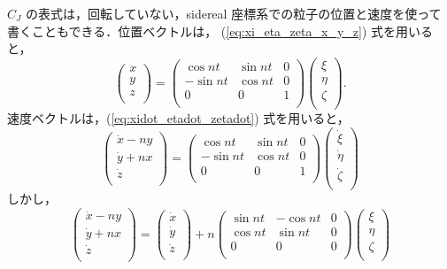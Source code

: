 \documentclass[11pt,a4paper,oneside,onecolumn]{jreport}
\begin{document}
$C_J$ の表式は，回転していない，sidereal 座標系での粒子の位置と速度を使って書くこともできる．位置ベクトルは， (\ref{eq:xi_eta_zeta_x_y_z}) 式を用いると，
\begin{equation}
\begin{pmatrix}
x\\
y\\
z\\
\end{pmatrix}
= 
\begin{pmatrix}
\cos nt & \sin nt & 0\\
- \sin nt & \cos nt & 0\\
0 & 0 & 1\\
\end{pmatrix}
\begin{pmatrix}
\xi\\
\eta\\
\zeta\\
\end{pmatrix}. \label{eq:x_y_z_xi_eta_zeta}
\end{equation}
速度ベクトルは，(\ref{eq:xidot_etadot_zetadot}) 式を用いると，
\begin{equation}
\begin{pmatrix}
\dot{x} - ny\\
\dot{y} + nx\\
\dot{z}\\
\end{pmatrix}
= 
\begin{pmatrix}
\cos nt & \sin nt & 0\\
- \sin nt & \cos nt & 0\\
0 & 0 & 1\\
\end{pmatrix}
\begin{pmatrix}
\dot{\xi}\\
\dot{\eta}\\
\dot{\zeta}\\
\end{pmatrix} \label{eq:xdot_ydot_zdot_1}
\end{equation}
しかし，
\begin{equation}
\begin{pmatrix}
\dot{x} - ny\\
\dot{y} + nx\\
\dot{z}\\
\end{pmatrix}
= 
\begin{pmatrix}
\dot{x}\\
\dot{y}\\
\dot{z}\\
\end{pmatrix}
+ n
\begin{pmatrix}
\sin nt & - \cos nt & 0\\
\cos nt & \sin nt & 0\\
0 & 0 & 0\\
\end{pmatrix}
\begin{pmatrix}
\xi\\
\eta\\
\zeta\\
\end{pmatrix} \label{eq:xdot_ydot_zdot_2}
\end{equation}
\end{document}
